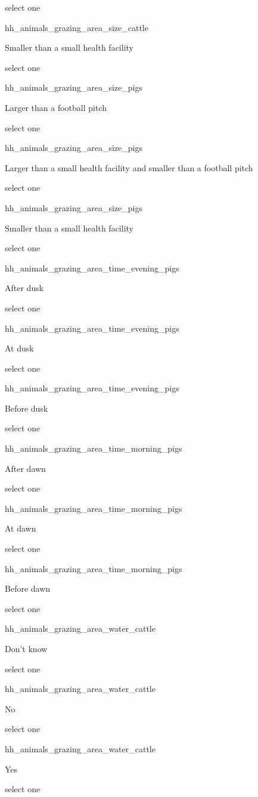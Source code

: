 \documentclass[]{article}
\begin{document}
select one

hh\_animals\_grazing\_area\_size\_cattle

Smaller than a small health facility

select one

hh\_animals\_grazing\_area\_size\_pigs

Larger than a football pitch

select one

hh\_animals\_grazing\_area\_size\_pigs

Larger than a small health facility and smaller than a football pitch

select one

hh\_animals\_grazing\_area\_size\_pigs

Smaller than a small health facility

select one

hh\_animals\_grazing\_area\_time\_evening\_pigs

After dusk

select one

hh\_animals\_grazing\_area\_time\_evening\_pigs

At dusk

select one

hh\_animals\_grazing\_area\_time\_evening\_pigs

Before dusk

select one

hh\_animals\_grazing\_area\_time\_morning\_pigs

After dawn

select one

hh\_animals\_grazing\_area\_time\_morning\_pigs

At dawn

select one

hh\_animals\_grazing\_area\_time\_morning\_pigs

Before dawn

select one

hh\_animals\_grazing\_area\_water\_cattle

Don't know

select one

hh\_animals\_grazing\_area\_water\_cattle

No

select one

hh\_animals\_grazing\_area\_water\_cattle

Yes

select one
\end{document}
